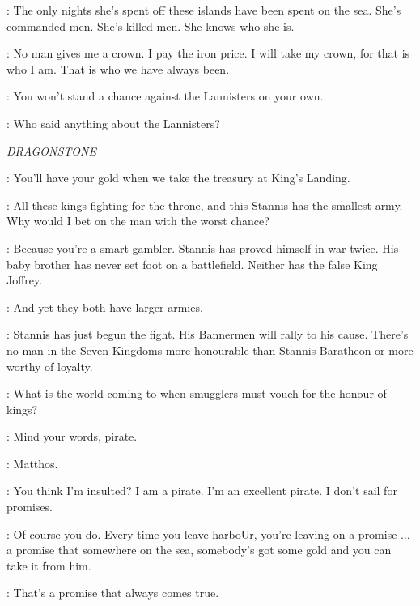 \BALON: The only nights she's spent off these islands have been spent on the sea. She's commanded men. She's killed men. She knows who she is.


\BALON: No man gives me a crown. I pay the iron price. I will take my crown, for that is who I am. That is who we have always been.


\THEON: You won't stand a chance against the Lannisters on your own.

\BALON: Who said anything about the Lannisters?


\scene

\textit{DRAGONSTONE}


\DAVOS: You'll have your gold when we take the treasury at King's Landing.

\SALLADHOR: All these kings fighting for the throne, and this Stannis has the smallest army. Why would I bet on the man with the worst chance?

\DAVOS: Because you're a smart gambler. Stannis has proved himself in war twice. His baby brother has never set foot on a battlefield. Neither has the false King Joffrey.

\SALLADHOR: And yet they both have larger armies.

\DAVOS: Stannis has just begun the fight. His Bannermen will rally to his cause. There's no man in the Seven Kingdoms more honourable than Stannis Baratheon or more worthy of loyalty.

\SALLADHOR: What is the world coming to when smugglers must vouch for the honour of kings?

\MATTHOS: Mind your words, pirate.

\DAVOS: Matthos.

\SALLADHOR: You think I'm insulted? I am a pirate. I'm an excellent pirate. I don't sail for promises.

\DAVOS: Of course you do. Every time you leave harboUr, you're leaving on a promise $\ldots$ a promise that somewhere on the sea, somebody's got some gold and you can take it from him.

\SALLADHOR: That's a promise that always comes true.

